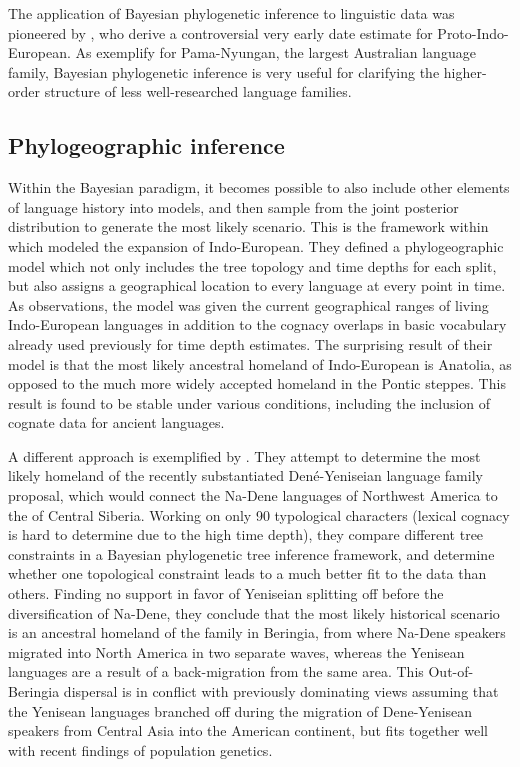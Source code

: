 The application of Bayesian phylogenetic inference to linguistic data was pioneered by \citet{gray_atkinson_2003}, who derive a controversial very early date estimate for Proto-Indo-European. As \citet{bowern_atkinson_2012} exemplify for Pama-Nyungan, the largest Australian language family, Bayesian phylogenetic inference is very useful for clarifying the higher-order structure of less well-researched language families.

\subsection{Phylogeographic inference}
Within the Bayesian paradigm, it becomes possible to also include other elements of language history into models, and then sample from the joint posterior distribution to generate the most likely scenario. This is the framework within which \citet{bouckaert_ea_2012} modeled the expansion of Indo-European. They defined a phylogeographic model which not only includes the tree topology and time depths for each split, but also assigns a geographical location to every language at every point in time. As observations, the model was given the current geographical ranges of living Indo-European languages in addition to the cognacy overlaps in basic vocabulary already used previously for time depth estimates. The surprising result of their model is that the most likely ancestral homeland of Indo-European is Anatolia, as opposed to the much more widely accepted homeland in the Pontic steppes. This result is found to be stable under various conditions, including the inclusion of cognate data 
for ancient languages.

A different approach is exemplified by \citet{sicoli_holton_2014}. They attempt to determine the most likely homeland of the recently substantiated Den\'{e}-Yeniseian language family proposal, which would connect the Na-Dene languages of Northwest America to the   of Central Siberia. Working on only 90 typological characters (lexical cognacy is hard to determine due to the high time depth), they compare different tree constraints in a Bayesian phylogenetic tree inference framework, and determine whether one topological constraint leads to a much better fit to the data than others. Finding no support in favor of Yeniseian splitting off before the diversification of Na-Dene, they conclude that the most likely historical scenario is an ancestral homeland of the family in Beringia, from where Na-Dene speakers migrated into North America in two separate waves, whereas the Yenisean languages are a result of a back-migration from the same area. This Out-of-Beringia dispersal is in conflict with previously dominating views assuming that the Yenisean languages branched off during the migration of Dene-Yenisean speakers from Central Asia into the American continent, but fits together well with recent findings of population genetics.

